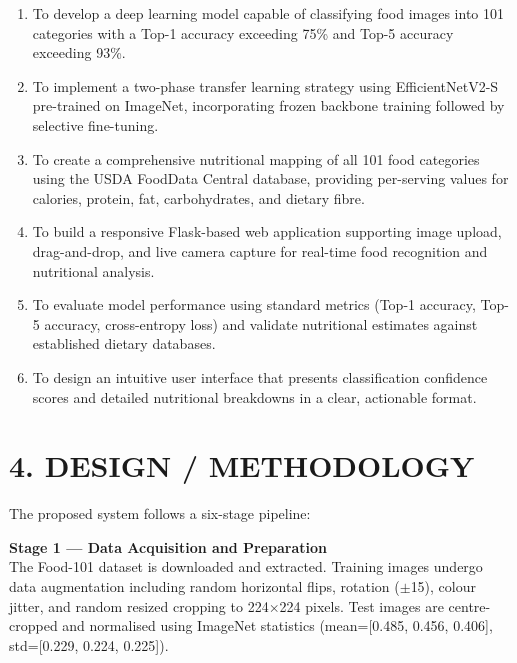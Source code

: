 \documentclass[12pt,a4paper]{article}
\begin{document}
\begin{enumerate}[leftmargin=1.5cm]
\item To develop a deep learning model capable of classifying food images into 101 categories with a Top-1 accuracy exceeding 75\% and Top-5 accuracy exceeding 93\%.

\item To implement a two-phase transfer learning strategy using EfficientNetV2-S pre-trained on ImageNet, incorporating frozen backbone training followed by selective fine-tuning.

\item To create a comprehensive nutritional mapping of all 101 food categories using the USDA FoodData Central database, providing per-serving values for calories, protein, fat, carbohydrates, and dietary fibre.

\item To build a responsive Flask-based web application supporting image upload, drag-and-drop, and live camera capture for real-time food recognition and nutritional analysis.

\item To evaluate model performance using standard metrics (Top-1 accuracy, Top-5 accuracy, cross-entropy loss) and validate nutritional estimates against established dietary databases.

\item To design an intuitive user interface that presents classification confidence scores and detailed nutritional breakdowns in a clear, actionable format.
\end{enumerate}


\newpage
\section{4. DESIGN / METHODOLOGY}

The proposed system follows a six-stage pipeline:

\textbf{Stage 1 --- Data Acquisition and Preparation}\\
The Food-101 dataset is downloaded and extracted. Training images undergo data augmentation including random horizontal flips, rotation ($\pm$15\textdegree), colour jitter, and random resized cropping to 224$\times$224 pixels. Test images are centre-cropped and normalised using ImageNet statistics (mean=[0.485, 0.456, 0.406], std=[0.229, 0.224, 0.225]).
\end{document}
